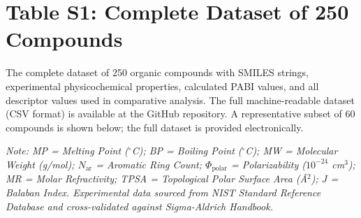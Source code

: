 \documentclass[12pt,a4paper]{article}
\begin{document}
\newpage

\section*{Table S1: Complete Dataset of 250 Compounds}

\noindent The complete dataset of 250 organic compounds with SMILES strings, experimental physicochemical properties, calculated PABI values, and all descriptor values used in comparative analysis. The full machine-readable dataset (CSV format) is available at the GitHub repository. A representative subset of 60 compounds is shown below; the full dataset is provided electronically.

\vspace{0.3cm}

\noindent\textit{Note: MP = Melting Point ($^{\circ}$C); BP = Boiling Point ($^{\circ}$C); MW = Molecular Weight (g/mol); $N_{\text{ar}}$ = Aromatic Ring Count; $\Phi_{\text{polar}}$ = Polarizability ($10^{-24}$ cm$^3$); MR = Molar Refractivity; TPSA = Topological Polar Surface Area (\AA$^2$); $J$ = Balaban Index. Experimental data sourced from NIST Standard Reference Database and cross-validated against Sigma-Aldrich Handbook.}

\vspace{0.3cm}
\end{document}
